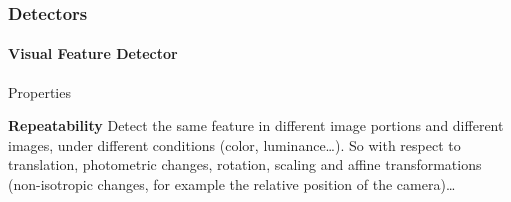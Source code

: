 \documentclass[10pt]{report}
\begin{document}
\subsubsection{Detectors}
\paragraph{Visual Feature Detector} Properties
\begin{list}{}{}
	\item \textbf{Repeatability} Detect the same feature in different image portions and different images, under different conditions (color, luminance\ldots). So with respect to translation, photometric changes, rotation, scaling and affine transformations (non-isotropic changes, for example the relative position of the camera)\ldots
\end{list}
\end{document}
